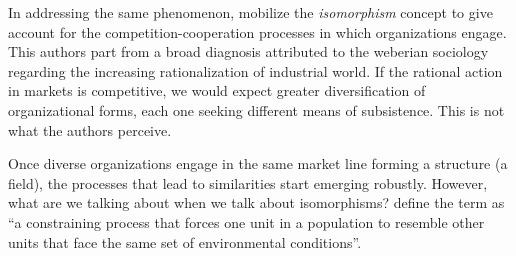 \documentclass[a4paper, 12pt, openright, oneside, german, french, brazil, english, article]{abntex2}
\begin{document}
	
	In addressing the same phenomenon,  mobilize the \textit{isomorphism} concept to give account for the competition-cooperation processes in which organizations engage. This authors part from a broad diagnosis attributed to the weberian sociology regarding the increasing rationalization of industrial world. If the rational action in markets is competitive, we would expect greater diversification of organizational forms, each one seeking different means of subsistence. This is not what the authors perceive.
	
	
	
	Once diverse organizations engage in the same market line forming a structure (a field), the processes that lead to similarities start emerging robustly. However, what are we talking about when we talk about isomorphisms?  define the term as ``a constraining process that forces one unit in a population to resemble other units that face the same set of environmental conditions''.
	
	
\end{document}
